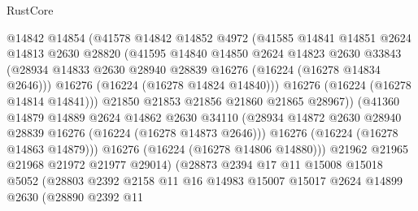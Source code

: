 \begin{lexlean}{RustCore}
\begin{coremodule}
                        @14842
                        @14854
                        (@41578
                          @14842
                          @14852
                          @4972
                          (@41585
                            @14841
                            @14851
                            @2624
                            @14813
                            @2630
                            @28820
                            (@41595
                              @14840
                              @14850
                              @2624
                              @14823
                              @2630
                              @33843
                              (@28934
                                @14833
                                @2630
                                @28940
                                @28839
                                @16276
                                (@16224 (@16278 @14834 @2646)))
                              @16276
                              (@16224 (@16278 @14824 @14840)))
                            @16276
                            (@16224 (@16278 @14814 @14841)))
                          @21850
                          @21853
                          @21856
                          @21860
                          @21865
                          @28967))
                      (@41360
                        @14879
                        @14889
                        @2624
                        @14862
                        @2630
                        @34110
                        (@28934 @14872 @2630 @28940 @28839 @16276 (@16224 (@16278 @14873 @2646)))
                        @16276
                        (@16224 (@16278 @14863 @14879)))
                      @16276
                      (@16224 (@16278 @14806 @14880)))
                    @21962
                    @21965
                    @21968
                    @21972
                    @21977
                    @29014)
                  (@28873
                    @2394
                    @17
                    @11
                    @15008
                    @15018
                    @5052
                    (@28803
                      @2392
                      @2158
                      @11
                      @16
                      @14983
                      @15007
                      @15017
                      @2624
                      @14899
                      @2630
                      (@28890
                        @2392
                        @11

\end{coremodule}
\end{lexlean}
